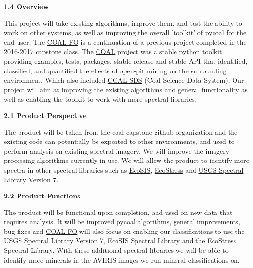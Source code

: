\documentclass[a4paper,12pt]{article}
\begin{document}
\noindent \textbf{1.4 Overview}\newline


\noindent This project will take existing algorithms, improve them, and test the ability to work on other systems, as well as improving the overall 'toolkit' of pycoal for the end user. The \href{https://capstone-coal.github.io/team}{COAL-FO} is a continuation of a previous project completed in the 2016-2017 capstone class. The \href{https://capstone-coal.github.io/}{COAL} project was a stable python toolkit providing examples, tests, packages, stable release and stable API that identified, classified, and quantified the effects of open-pit mining on the surrounding environment. Which also included \href{https://github.com/capstone-coal/coal-sds}{COAL-SDS} (Coal Science Data System). Our project will aim at improving the existing algorithms and general functionality as well as enabling the toolkit to work with more spectral libraries. \newline


\newline


\noindent \textbf{2.1 Product Perspective}\newline


\noindent The product will be taken from the coal-capstone github organization and the existing code can potentially be exported to other environments, and used to perform analysis on existing spectral imagery. We will improve the imagery processing algorithms currently in use. We will allow the product to identify more spectra in other spectral libraries such as \href{https://ecosis.org/}{EcoSIS}, \href{https://speclib.jpl.nasa.gov/}{EcoStress} and \href{https://speclab.cr.usgs.gov/spectral-lib.html}{USGS Spectral Library Version 7}.\newline


\noindent \textbf{2.2 Product Functions}\newline


\noindent The product will be functional upon completion, and used on new data that requires analysis. It will be improved pycoal algorithms, general improvements, bug fixes and  \href{https://capstone-coal.github.io/team}{COAL-FO} will also focus on enabling our classifications to use the \href{https://speclab.cr.usgs.gov/spectral-lib.html}{USGS Spectral Library Version 7}, \href{https://ecosis.org/}{EcoSIS} Spectral Library and the \href{https://speclib.jpl.nasa.gov/}{EcoStress} Spectral Library.  With these additional spectral libraries we will be able to identify more minerals in the AVIRIS images we run mineral classifications on.\newline
\end{document}
